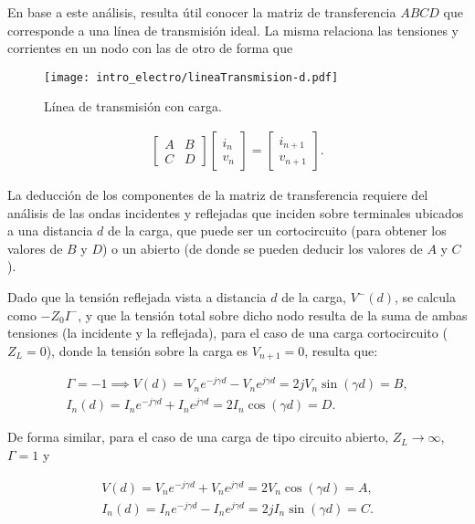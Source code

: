 En base a este análisis, resulta útil conocer la matriz de transferencia $ABCD$ que corresponde a una línea de transmisión ideal. La misma relaciona las tensiones y corrientes en un nodo con las de otro de forma que

\begin{figure}[htp]
	\centering
	\texttt{[image: intro\_electro/lineaTransmision-d.pdf]}
	\caption{Línea de transmisión con carga.}
	\label{fig:TL-con-carga}
\end{figure}

\begin{align}
\begin{bmatrix}
A & B \\
C & D
\end{bmatrix}
\begin{bmatrix}
i_n \\
v_n
\end{bmatrix}
=
\begin{bmatrix}
i_{n+1} \\
v_{n+1}
\end{bmatrix}.
\end{align}

La deducción de los componentes de la matriz de transferencia requiere del análisis de las ondas incidentes y reflejadas que inciden sobre terminales ubicados a una distancia $d$ de la carga, que puede ser un cortocircuito (para obtener los valores de $B$ y $D$) o un abierto (de donde se pueden deducir los valores de $A$ y $C$).

Dado que la tensión reflejada vista a distancia $d$ de la carga, $V^{-}(d)$, se calcula como $-Z_0 I^{-}$, y que la tensión total sobre dicho nodo resulta de la suma de ambas tensiones (la incidente y la reflejada), para el caso de una carga cortocircuito ($Z_L = 0$), donde la tensión sobre la carga es $V_{n+1} = 0$, resulta que:

\begin{align}
	\Gamma = -1 \implies V(d) = V_n e^{-j\gamma d} - V_n e^{j\gamma d} = 2 j V_n \sin(\gamma d) = B, \\
	I_n (d) = I_n e^{-j\gamma d} + I_n e^{j\gamma d} = 2 I_n \cos(\gamma d) = D.
\end{align}

De forma similar, para el caso de una carga de tipo circuito abierto, $Z_L \rightarrow \infty$, $\Gamma = 1$ y

\begin{align}
V(d) = V_n e^{-j\gamma d} + V_n e^{j\gamma d} = 2 V_n \cos(\gamma d) = A, \\
I_n (d) = I_n e^{-j\gamma d} - I_n e^{j\gamma d} = 2 j I_n \sin(\gamma d) = C.
\end{align}

